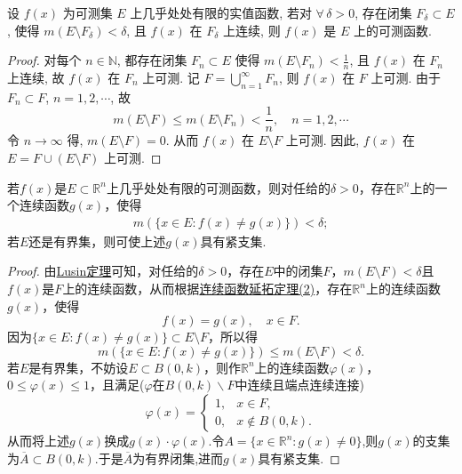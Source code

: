 \documentclass[../../main.tex]{subfiles}%
\begin{document}
\begin{theorem}\label{theorem:Lusin定理的逆定理}
设 \( f(x) \) 为可测集 \( E \) 上几乎处处有限的实值函数, 若对 \( \forall\,\delta > 0 \), 存在闭集 \( F_{\delta} \subset E \), 使得 \( m(E \setminus F_{\delta}) < \delta \), 且 \( f(x) \) 在 \( F_{\delta} \) 上连续, 则 \( f(x) \) 是 \( E \) 上的可测函数.
\end{theorem}
\begin{proof}

对每个 \( n \in \mathbb{N} \), 都存在闭集 \( F_{n} \subset E \) 使得 \( m(E \setminus F_{n}) < \frac{1}{n} \), 且 \( f(x) \) 在 \( F_{n} \) 上连续, 故 \( f(x) \) 在 \( F_{n} \) 上可测.
记 \( F = \bigcup_{n = 1}^{\infty} F_{n} \), 则 \( f(x) \) 在 \( F \) 上可测. 由于 \( F_{n} \subset F \), \( n = 1, 2, \cdots \), 故
\[
m(E \setminus F) \leqslant m(E \setminus F_{n}) < \frac{1}{n}, \quad n = 1, 2, \cdots
\]
令 \( n \to \infty \) 得, \( m(E \setminus F) = 0 \). 从而 \( f(x) \) 在 \( E \setminus F \) 上可测. 因此, \( f(x) \) 在 \( E = F \cup (E \setminus F) \) 上可测.

\end{proof}

\begin{corollary}\label{corollary:推论3.19}
若\(f(x)\)是\(E \subset \mathbb{R}^{n}\)上几乎处处有限的可测函数，则对任给的\(\delta > 0\)，存在\(\mathbb{R}^{n}\)上的一个连续函数\(g(x)\)，使得
\begin{align*}
m(\{x \in E: f(x) \neq g(x)\}) < \delta; 
\end{align*}
若\(E\)还是有界集，则可使上述\(g(x)\)具有紧支集.
\end{corollary}
\begin{proof}

由\hyperref[theorem:Lusin(卢津)定理]{Lusin定理}可知，对任给的\(\delta > 0\)，存在\(E\)中的闭集\(F\)，\(m(E \setminus F) < \delta\)且\(f(x)\)是\(F\)上的连续函数，从而根据\hyperref[theorem:连续函数延拓定理]{连续函数延拓定理(2)}，存在\(\mathbb{R}^{n}\)上的连续函数\(g(x)\)，使得
\[f(x) = g(x), \quad x \in F.\]
因为\(\{x \in E: f(x) \neq g(x)\} \subset E \setminus F\)，所以得
\[m(\{x \in E: f(x) \neq g(x)\}) \leqslant m(E \setminus F) < \delta.\]
若\(E\)是有界集，不妨设\(E \subset B(0, k)\)，则作\(\mathbb{R}^{n}\)上的连续函数\(\varphi(x)\)，\(0 \leqslant \varphi(x) \leqslant 1\)，且满足($\varphi$在$B(0,k)\backslash F$中连续且端点连续连接)
\[\varphi(x) = 
\begin{cases}
1, & x \in F, \\
0, & x \notin B(0, k).
\end{cases}\]
从而将上述\(g(x)\)换成\(g(x) \cdot \varphi(x)\).令$A=\{x\in \mathbb{R}^n:g(x)\ne 0\}$,则$g(x)$的支集为$\overline{A}\subset B(0,k)$.于是$\overline{A}$为有界闭集,进而$g(x)$具有紧支集.

\end{proof}
\end{document}

